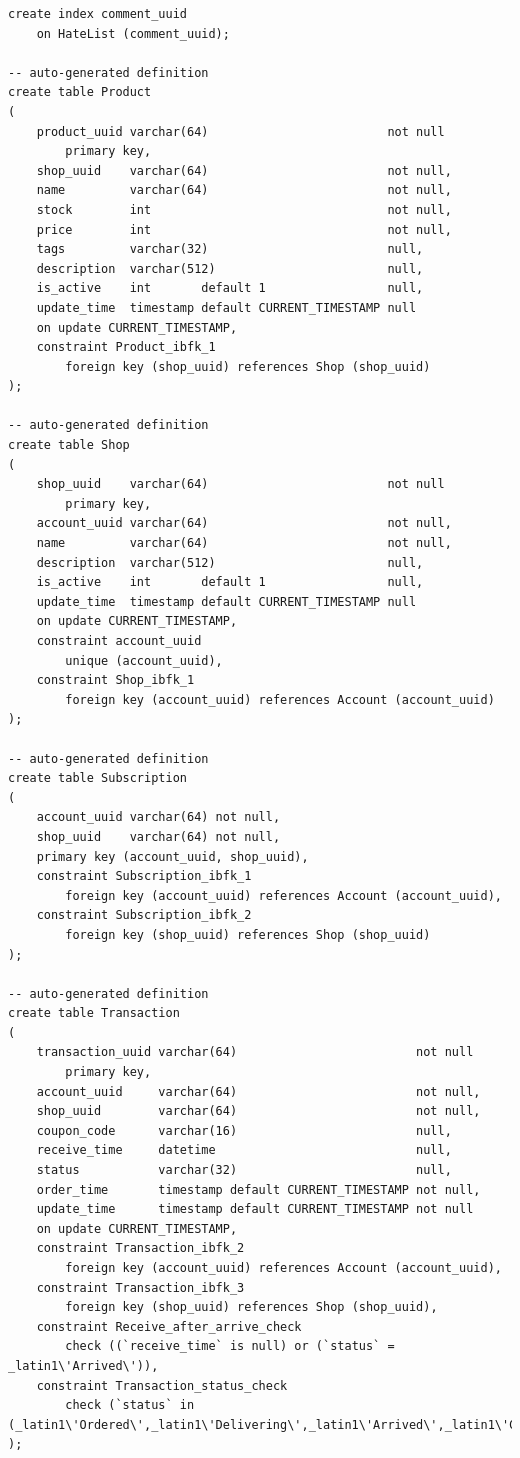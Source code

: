 \documentclass[a4paper, 12pt]{article}
\begin{document}
\begin{verbatim}
create index comment_uuid
    on HateList (comment_uuid);

-- auto-generated definition
create table Product
(
    product_uuid varchar(64)                         not null
        primary key,
    shop_uuid    varchar(64)                         not null,
    name         varchar(64)                         not null,
    stock        int                                 not null,
    price        int                                 not null,
    tags         varchar(32)                         null,
    description  varchar(512)                        null,
    is_active    int       default 1                 null,
    update_time  timestamp default CURRENT_TIMESTAMP null
    on update CURRENT_TIMESTAMP,
    constraint Product_ibfk_1
        foreign key (shop_uuid) references Shop (shop_uuid)
);

-- auto-generated definition
create table Shop
(
    shop_uuid    varchar(64)                         not null
        primary key,
    account_uuid varchar(64)                         not null,
    name         varchar(64)                         not null,
    description  varchar(512)                        null,
    is_active    int       default 1                 null,
    update_time  timestamp default CURRENT_TIMESTAMP null
    on update CURRENT_TIMESTAMP,
    constraint account_uuid
        unique (account_uuid),
    constraint Shop_ibfk_1
        foreign key (account_uuid) references Account (account_uuid)
);

-- auto-generated definition
create table Subscription
(
    account_uuid varchar(64) not null,
    shop_uuid    varchar(64) not null,
    primary key (account_uuid, shop_uuid),
    constraint Subscription_ibfk_1
        foreign key (account_uuid) references Account (account_uuid),
    constraint Subscription_ibfk_2
        foreign key (shop_uuid) references Shop (shop_uuid)
);

-- auto-generated definition
create table Transaction
(
    transaction_uuid varchar(64)                         not null
        primary key,
    account_uuid     varchar(64)                         not null,
    shop_uuid        varchar(64)                         not null,
    coupon_code      varchar(16)                         null,
    receive_time     datetime                            null,
    status           varchar(32)                         null,
    order_time       timestamp default CURRENT_TIMESTAMP not null,
    update_time      timestamp default CURRENT_TIMESTAMP not null 
    on update CURRENT_TIMESTAMP,
    constraint Transaction_ibfk_2
        foreign key (account_uuid) references Account (account_uuid),
    constraint Transaction_ibfk_3
        foreign key (shop_uuid) references Shop (shop_uuid),
    constraint Receive_after_arrive_check
        check ((`receive_time` is null) or (`status` = _latin1\'Arrived\')),
	constraint Transaction_status_check
		check (`status` in (_latin1\'Ordered\',_latin1\'Delivering\',_latin1\'Arrived\',_latin1\'Cancelled\'))
);


\end{verbatim}
\end{document}
